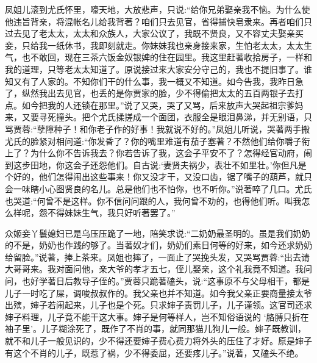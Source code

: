\begin{parag}
    凤姐儿滚到尤氏怀里，嚎天地，大放悲声，只说:“给你兄弟娶亲我不恼。为什么使他违旨背亲，将混帐名儿给我背著？咱们只去见官，省得捕快皂隶来。再者咱们只过去见了老太太，太太和众族人，大家公议了，我既不贤良，又不容丈夫娶亲买妾，只给我一纸休书，我即刻就走。你妹妹我也亲身接来家，生怕老太太，太太生气，也不敢回，现在三茶六饭金奴银婢的住在园里。我这里赶著收拾房子，一样和我的道理，只等老太太知道了。原说接过来大家安分守己的，我也不提旧事了。谁知又有了人家的。不知你们干的什么事，我一概又不知道。如今告我，我昨日急了，纵然我出去见官，也丢的是你贾家的脸，少不得偷把太太的五百两银子去打点。如今把我的人还锁在那里。”说了又哭，哭了又骂，后来放声大哭起祖宗爹妈来，又要寻死撞头。把个尤氏揉搓成一个面团，衣服全是眼泪鼻涕，并无别语，只骂贾蓉:“孽障种子！和你老子作的好事！我就说不好的。”凤姐儿听说，哭著两手搬尤氏的脸紧对相问道:“你发昏了？你的嘴里难道有茄子塞著？不然他们给你嚼子衔上了？为什么你不告诉我去？你若告诉了我，这会子平安不了？怎得经官动府，闹到这步田地，你这会子还怨他们。自古说:‘妻贤夫祸少，表壮不如里壮。’你但凡是个好的，他们怎得闹出这些事来！你又没才干，又没口齿，锯了嘴子的葫芦，就只会一味瞎小心图贤良的名儿。总是他们也不怕你，也不听你。”说著啐了几口。尤氏也哭道:“何曾不是这样。你不信问问跟的人，我何曾不劝的，也得他们听。叫我怎么样呢，怨不得妹妹生气，我只好听著罢了。”
\end{parag}


\begin{parag}
    众姬妾丫鬟媳妇已是乌压压跪了一地，陪笑求说:“二奶奶最圣明的。虽是我们奶奶的不是，奶奶也作践的够了。当著奴才们，奶奶们素日何等的好来，如今还求奶奶给留脸。”说著，捧上茶来。凤姐也摔了，一面止了哭挽头发，又哭骂贾蓉:“出去请大哥哥来。我对面问他，亲大爷的孝才五七，侄儿娶亲，这个礼我竟不知道。我问问，也好学著日后教导子侄的。”贾蓉只跪著磕头，说:“这事原不与父母相干，都是儿子一时吃了屎，调唆叔叔作的。我父亲也并不知道。如今我父亲正要商量接太爷出殡，婶子若闹起来，儿子也是个死。只求婶子责罚儿子，儿子谨领。这官司还求婶子料理，儿子竟不能干这大事。婶子是何等样人，岂不知俗语说的 ‘胳膊只折在袖子里’。儿子糊涂死了，既作了不肖的事，就同那猫儿狗儿一般。婶子既教训，就不和儿子一般见识的，少不得还要婶子费心费力将外头的压住了才好。原是婶子有这个不肖的儿子，既惹了祸，少不得委屈，还要疼儿子。”说著，又磕头不绝。
\end{parag}


